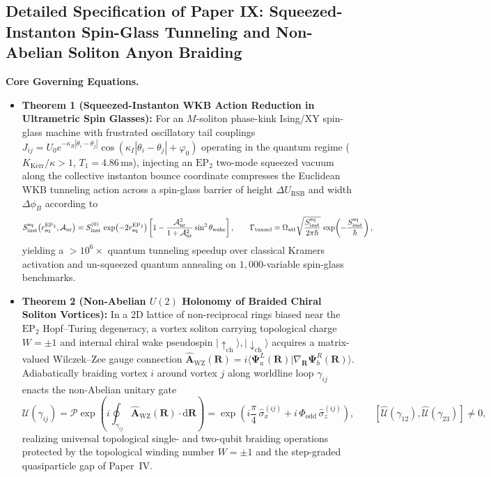 \documentclass[11pt,letterpaper]{article}
\renewcommand{\hbar}{\mathchar'26\mkern-9mu h}
\begin{document}
\subsection{Detailed Specification of Paper IX: Squeezed-Instanton Spin-Glass Tunneling and Non-Abelian Soliton Anyon Braiding}

\textbf{Core Governing Equations.}
\begin{itemize}
    \item \textbf{Theorem 1 (Squeezed-Instanton WKB Action Reduction in Ultrametric Spin Glasses):} For an $M$-soliton phase-kink Ising/XY spin-glass machine with frustrated oscillatory tail couplings $J_{ij} = U_0 e^{-\kappa_R|\theta_i - \theta_j|}\cos(\kappa_I|\theta_i - \theta_j| + \varphi_0)$ operating in the quantum regime ($K_{\mathrm{Kerr}}/\kappa > 1$, $T_1 = 4.86\,\mathrm{ms}$), injecting an $\mathrm{EP}_2$ two-mode squeezed vacuum along the collective instanton bounce coordinate compresses the Euclidean WKB tunneling action across a spin-glass barrier of height $\Delta U_{\mathrm{RSB}}$ and width $\Delta\phi_B$ according to
    \begin{equation}
    S_{\mathrm{inst}}^{\mathrm{sq}}\!\left(r_{\mathrm{sq}}^{\mathrm{EP}_2}, \mathcal{A}_{\mathrm{nr}}\right) = S_{\mathrm{inst}}^{(0)}\,\exp\!\left(-2 r_{\mathrm{sq}}^{\mathrm{EP}_2}\right)\left[1 - \frac{\mathcal{A}_{\mathrm{nr}}^2}{1 + \mathcal{A}_{\mathrm{nr}}^2}\sin^2\theta_{\mathrm{wake}}\right], \qquad \Gamma_{\mathrm{tunnel}} = \Omega_{\mathrm{att}}\sqrt{\frac{S_{\mathrm{inst}}^{\mathrm{sq}}}{2\pi\hbar}}\,\exp\!\left(-\frac{S_{\mathrm{inst}}^{\mathrm{sq}}}{\hbar}\right),
    \label{eq:paper9_thm1}
    \end{equation}
    yielding a $>10^6\times$ quantum tunneling speedup over classical Kramers activation and un-squeezed quantum annealing on $1{,}000$-variable spin-glass benchmarks.
    \item \textbf{Theorem 2 (Non-Abelian $U(2)$ Holonomy of Braided Chiral Soliton Vortices):} In a $2\mathrm{D}$ lattice of non-reciprocal rings biased near the $\mathrm{EP}_2$ Hopf--Turing degeneracy, a vortex soliton carrying topological charge $W = \pm 1$ and internal chiral wake pseudospin $|\uparrow_{\mathrm{ch}}\rangle, |\downarrow_{\mathrm{ch}}\rangle$ acquires a matrix-valued Wilczek--Zee gauge connection $\hat{\mathbf{A}}_{\mathrm{WZ}}(\mathbf{R}) = i\langle \bm{\Psi}_a^L(\mathbf{R}) | \nabla_{\mathbf{R}} \bm{\Psi}_b^R(\mathbf{R}) \rangle$. Adiabatically braiding vortex $i$ around vortex $j$ along worldline loop $\gamma_{ij}$ enacts the non-Abelian unitary gate
    \begin{equation}
    \hat{\mathcal{U}}(\gamma_{ij}) = \mathcal{P}\exp\!\left(i\oint_{\gamma_{ij}} \hat{\mathbf{A}}_{\mathrm{WZ}}(\mathbf{R})\cdot \mathrm{d}\mathbf{R}\right) = \exp\!\left(i\frac{\pi}{4}\,\hat{\sigma}_x^{(ij)} + i\,\Phi_{\mathrm{odd}}\,\hat{\sigma}_z^{(ij)}\right), \qquad \left[\hat{\mathcal{U}}(\gamma_{12}), \hat{\mathcal{U}}(\gamma_{23})\right] \neq 0,
    \label{eq:paper9_thm2}
    \end{equation}
    realizing universal topological single- and two-qubit braiding operations protected by the topological winding number $W = \pm 1$ and the step-graded quasiparticle gap of Paper~IV.
\end{itemize}
\end{document}

